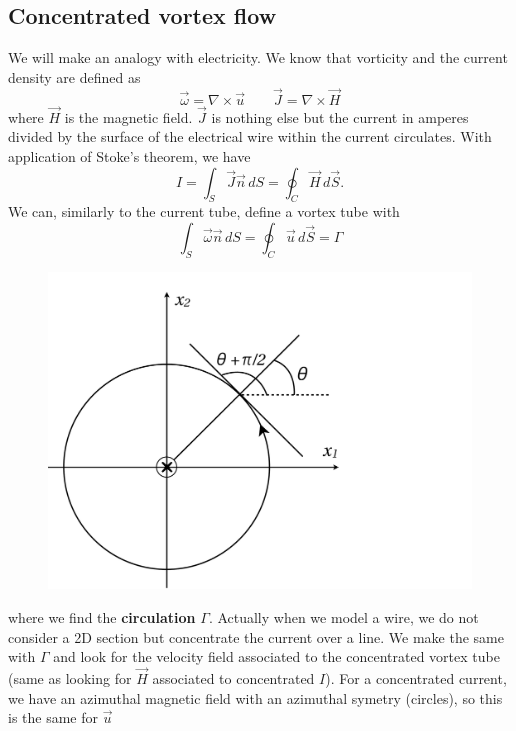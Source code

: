 	\subsection{Concentrated vortex flow}
		We will make an analogy with electricity. We know that vorticity and the current density are defined as
		\begin{equation}
			\vec{\omega} = \nabla \times \vec{u} \qquad \vec{J} = \nabla \times \vec{H}
		\end{equation}
		where $\vec{H}$ is the magnetic field. $\vec{J}$ is nothing else but the current in amperes divided by the surface of the electrical wire within the current circulates. With application of Stoke's theorem, we have
		\begin{equation}
			I = \int _S \vec{J}\vec{n}\, dS = \oint _C \vec{H}\, d\vec{S}.
		\end{equation} 
		We can, similarly to the current tube, define a vortex tube with 
		\begin{equation}
			\int _S \vec{\omega} \vec{n}\, dS = \oint _C \vec{u}\, d\vec{S} = \Gamma 
		\end{equation}
		\begin{figure}
		\vspace{-5mm}
		\includegraphics[scale=0.14]{ch3/5}
		\end{figure}
		where we find the \textbf{circulation} $\Gamma$. Actually when we model a wire, we do not consider a 2D section but concentrate the current over a line. We make the same with $\Gamma$ and look for the velocity field associated to the concentrated vortex tube (same as looking for $\vec{H}$ associated to concentrated $I$). For a concentrated current, we have an azimuthal magnetic field with an azimuthal symetry (circles), so this is the same for $\vec{u}$
